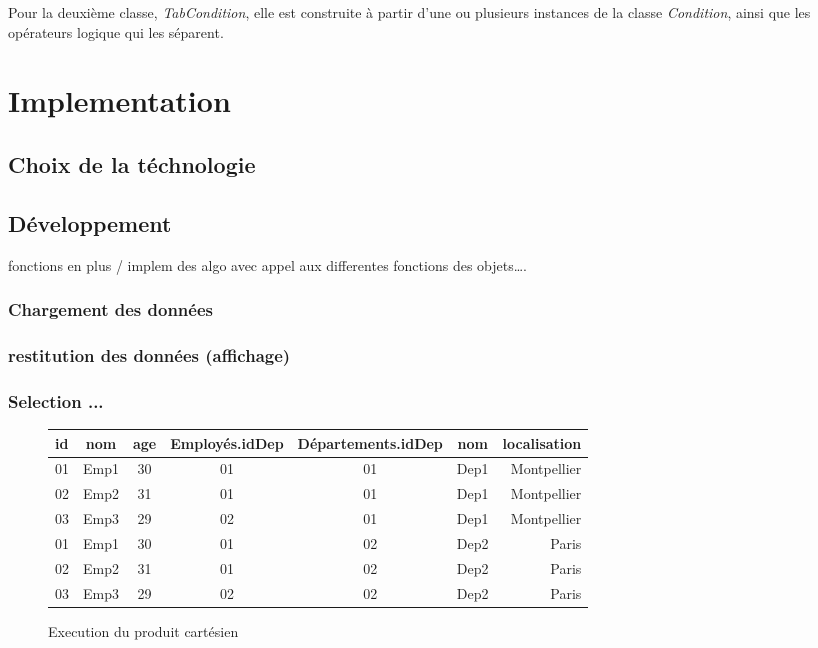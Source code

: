 \documentclass[oneside,13pt,a4paper]{report}
\begin{document}
Pour la deuxième classe, \textit{TabCondition}, elle est construite à partir d'une ou plusieurs instances de la classe \textit{Condition}, ainsi que les opérateurs logique qui les séparent.



\chapter{Implementation}

\section{Choix de la téchnologie}

\section{Développement}

fonctions en plus / implem des algo avec appel aux differentes fonctions des objets….

\subsection{Chargement des données}

\subsection{restitution des données (affichage)}

\subsection{Selection ...}
	\begin{figure}[h!]
		\centering
		\caption{Execution du produit cartésien}
		\begin{tabular}{|l|c|c|c|c|c|r|}
			\hline
			id   & nom  & age & Employés.idDep & Départements.idDep & nom   & localisation
			\\
			\hline
			01 & Emp1 &  30 & 01 & 01 & Dep1 &  Montpellier \\
			02 & Emp2 &  31 & 01 & 01 & Dep1 &  Montpellier \\
			03 & Emp3 &  29 & 02 & 01 & Dep1 &  Montpellier \\
			01 & Emp1 &  30 & 01 & 02 & Dep2 &  Paris \\
			02 & Emp2 &  31 & 01 & 02 & Dep2 &  Paris \\
			03 & Emp3 &  29 & 02 & 02 & Dep2 &  Paris \\
			\hline
		\end{tabular}
	\end{figure}
\end{document}
